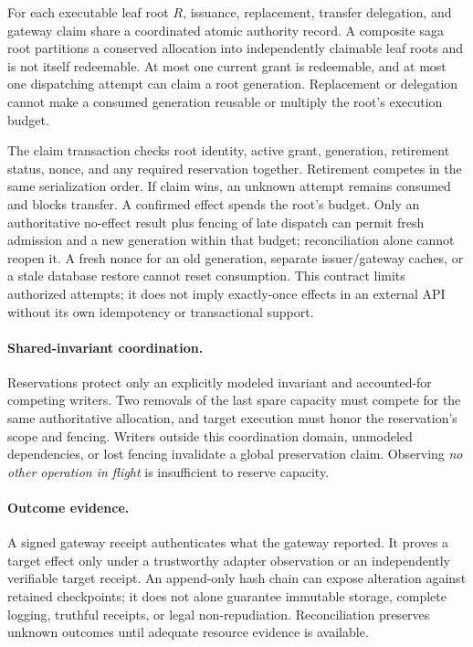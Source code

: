 \begin{proposition}
For each executable leaf root $R$, issuance, replacement, transfer delegation, and gateway claim share a coordinated atomic authority record. A composite saga root partitions a conserved allocation into independently claimable leaf roots and is not itself redeemable. At most one current grant is redeemable, and at most one dispatching attempt can claim a root generation. Replacement or delegation cannot make a consumed generation reusable or multiply the root's execution budget.
\end{proposition}

The claim transaction checks root identity, active grant, generation, retirement status, nonce, and any required reservation together. Retirement competes in the same serialization order. If claim wins, an unknown attempt remains consumed and blocks transfer. A confirmed effect spends the root's budget. Only an authoritative no-effect result plus fencing of late dispatch can permit fresh admission and a new generation within that budget; reconciliation alone cannot reopen it. A fresh nonce for an old generation, separate issuer/gateway caches, or a stale database restore cannot reset consumption. This contract limits authorized attempts; it does not imply exactly-once effects in an external API without its own idempotency or transactional support.

\paragraph{Shared-invariant coordination.}
Reservations protect only an explicitly modeled invariant and accounted-for competing writers. Two removals of the last spare capacity must compete for the same authoritative allocation, and target execution must honor the reservation's scope and fencing. Writers outside this coordination domain, unmodeled dependencies, or lost fencing invalidate a global preservation claim. Observing \emph{no other operation in flight} is insufficient to reserve capacity.

\paragraph{Outcome evidence.}
A signed gateway receipt authenticates what the gateway reported. It proves a target effect only under a trustworthy adapter observation or an independently verifiable target receipt. An append-only hash chain can expose alteration against retained checkpoints; it does not alone guarantee immutable storage, complete logging, truthful receipts, or legal non-repudiation. Reconciliation preserves unknown outcomes until adequate resource evidence is available.

